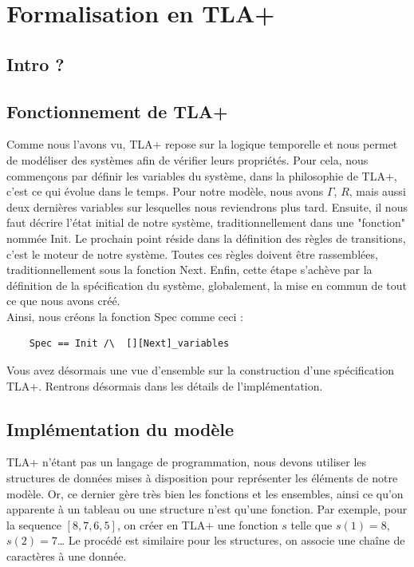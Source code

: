 \documentclass[runningheads]{llncs}
\begin{document}
\section{Formalisation en TLA+}
\label{sec:tla-formalisation}

\subsection{Intro ?}

\subsection{Fonctionnement de TLA+}
Comme nous l'avons vu, TLA+ repose sur la logique temporelle et nous permet de modéliser des systèmes afin de vérifier leurs propriétés.
Pour cela, nous commençons par définir les variables du système, dans la philosophie de TLA+, c'est ce qui évolue dans le temps. 
Pour notre modèle, nous avons $\Gamma$, $R$, mais aussi deux dernières variables sur lesquelles nous reviendrons plus tard.
Ensuite, il nous faut décrire l'état initial de notre système, traditionnellement dans une "fonction" nommée Init.
Le prochain point réside dans la définition des règles de transitions, c'est le moteur de notre système. 
Toutes ces règles doivent être rassemblées, traditionnellement sous la fonction Next. 
Enfin, cette étape s'achève par la définition de la spécification du système, globalement, la mise en commun de tout ce que nous avons créé.
\\Ainsi, nous créons la fonction Spec comme ceci :
\begin{verbatim}
    Spec == Init /\  [][Next]_variables
\end{verbatim}%
Vous avez désormais une vue d'ensemble sur la construction d'une spécification TLA+.
Rentrons désormais dans les détails de l'implémentation.


\subsection{Implémentation du modèle}
TLA+ n'étant pas un langage de programmation, nous devons utiliser les structures de données mises à disposition pour représenter les éléments de notre modèle.
Or, ce dernier gère très bien les fonctions et les ensembles, ainsi ce qu'on apparente à un tableau ou une structure n'est qu'une fonction.
Par exemple, pour la sequence $[8,7,6,5]$, on créer en TLA+ une fonction $s$ telle que $s(1) = 8$, $s(2) = 7$\dots
Le procédé est similaire pour les structures, on associe une chaîne de caractères à une donnée.
\end{document}
